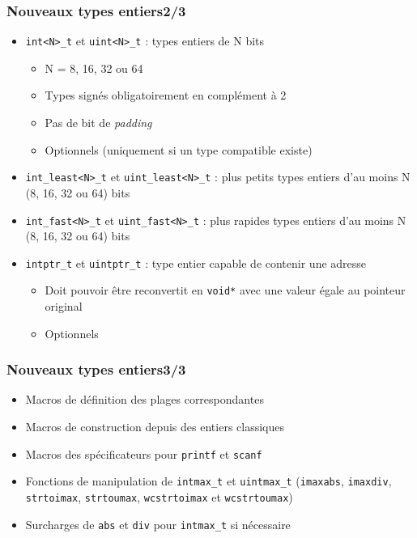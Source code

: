 \documentclass[C++.tex]{subfiles}
\begin{document}
\begin{frame}[fragile]
	\frametitle{Nouveaux types entiers\titlehfill{}2/3}
	\begin{itemize}
		\item \lstinline|int<N>_t| et \lstinline|uint<N>_t| : types entiers de N bits
		\begin{itemize}
			\item N = 8, 16, 32 ou 64
			\item Types signés obligatoirement en complément à 2


			\item Pas de bit de \textit{padding}
			\item Optionnels (uniquement si un type compatible existe)
		\end{itemize}
		\item \lstinline|int_least<N>_t| et \lstinline|uint_least<N>_t| : plus petits types entiers d'au moins N (8, 16, 32 ou 64) bits
		\item \lstinline|int_fast<N>_t| et \lstinline|uint_fast<N>_t| : plus rapides types entiers d'au moins N (8, 16, 32 ou 64) bits
		\item \lstinline|intptr_t| et \lstinline|uintptr_t| : type entier capable de contenir une adresse
		\begin{itemize}
			\item Doit pouvoir être reconvertit en \lstinline|void*| avec une valeur égale au pointeur original
			\item Optionnels
		\end{itemize}
	\end{itemize}
\end{frame}

\begin{frame}[fragile]
	\frametitle{Nouveaux types entiers\titlehfill{}3/3}
	\begin{itemize}
		\item Macros de définition des plages correspondantes
		\item Macros de construction depuis des entiers \og classiques\fg{}
		\item Macros des spécificateurs pour \lstinline|printf| et \lstinline|scanf|
		\item Fonctions de manipulation de \lstinline|intmax_t| et \lstinline|uintmax_t| (\lstinline|imaxabs|, \lstinline|imaxdiv|, \lstinline|strtoimax|, \lstinline|strtoumax|, \lstinline|wcstrtoimax| et \lstinline|wcstrtoumax|)
		\item Surcharges de \lstinline|abs| et \lstinline|div| pour \lstinline|intmax_t| si nécessaire

	\end{itemize}
\end{frame}
\end{document}
